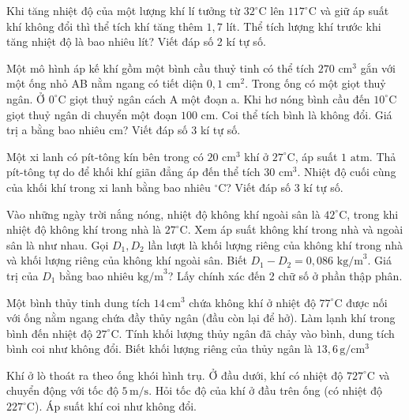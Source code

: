 \documentclass[12pt,a4paper,oneside]{article}
\begin{document}
\begin{ex}
	Khi tăng nhiệt độ của một lượng khí lí tưởng từ $32^\circ\text{C}$ lên $117^\circ\text{C}$ và giữ áp suất khí không đổi thì thể tích khí tăng thêm $1{,}7$ lít. Thể tích lượng khí trước khi tăng nhiệt độ là bao nhiêu lít? Viết đáp số 2 kí tự số.
\end{ex}

\begin{ex}
	Một mô hình áp kế khí gồm một bình cầu thuỷ tinh có thể tích $270 \text{ cm}^3$ gắn với một ống nhỏ AB nằm ngang có tiết diện $0{,}1 \text{ cm}^2$. Trong ống có một giọt thuỷ ngân. Ở $0^\circ\text{C}$ giọt thuỷ ngân cách A một đoạn a. Khi hơ nóng bình cầu đến $10^\circ\text{C}$ giọt thuỷ ngân di chuyển một đoạn $100 \text{ cm}$. Coi thể tích bình là không đổi. Giá trị a bằng bao nhiêu cm? Viết đáp số 3 kí tự số.
\end{ex}

\begin{ex}
	Một xi lanh có pít-tông kín bên trong có $20 \text{ cm}^3$ khí ở $27^\circ\text{C}$, áp suất $1 \text{ atm}$. Thả pít-tông tự do để khối khí giãn đẳng áp đến thể tích $30 \text{ cm}^3$. Nhiệt độ cuối cùng của khối khí trong xi lanh bằng bao nhiêu $^\circ\text{C}$? Viết đáp số 3 kí tự số.
\end{ex}

\begin{ex}
	Vào những ngày trời nắng nóng, nhiệt độ không khí ngoài sân là $42^\circ\text{C}$, trong khi nhiệt độ không khí trong nhà là $27^\circ\text{C}$. Xem áp suất không khí trong nhà và ngoài sân là như nhau. Gọi $D_1, D_2$ lần lượt là khối lượng riêng của không khí trong nhà và khối lượng riêng của không khí ngoài sân. Biết $D_1 - D_2 = 0{,}086 \text{ kg/m}^3$. Giá trị của $D_1$ bằng bao nhiêu $\text{kg/m}^3$? Lấy chính xác đến 2 chữ số ở phần thập phân.
\end{ex}

\begin{ex}
	Một bình thủy tinh dung tích $14\, \text{cm}^3$ chứa không khí ở nhiệt độ $77^{\circ}\text{C}$ được nối với ống nằm ngang chứa đầy thủy ngân (đầu còn lại để hở). Làm lạnh khí trong bình đến nhiệt độ $27^{\circ}\text{C}$. Tính khối lượng thủy ngân đã chảy vào bình, dung tích bình coi như không đổi. Biết khối lượng riêng của thủy ngân là $13,6\, {\text{g}}/{\text{cm}^3}$
\end{ex}

\begin{ex}
	Khí ở lò thoát ra theo ống khói hình trụ. Ở đầu dưới, khí có nhiệt độ $727^{\circ}\text{C}$ và chuyển động với tốc độ $5\, \text{m/s}$. Hỏi tốc độ của khí ở đầu trên ống (có nhiệt độ $227^{\circ}\text{C}$). Áp suất khí coi như không đổi.
\end{ex}
\end{document}
